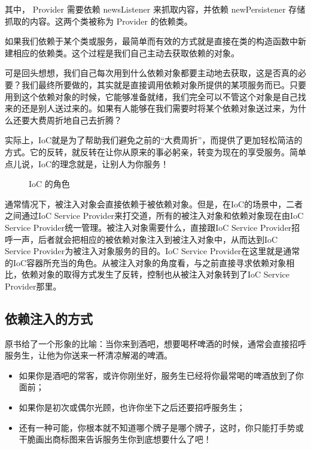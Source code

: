 其中， Provider 需要依赖 newsListener 来抓取内容，并依赖 newPersistener 存储抓取的内容。这两个类被称为 Provider 的依赖类。

如果我们依赖于某个类或服务，最简单而有效的方式就是直接在类的构造函数中新建相应的依赖类。这个过程是我们自己主动去获取依赖的对象。

可是回头想想，我们自己每次用到什么依赖对象都要主动地去获取，这是否真的必要？我们最终所要做的，其实就是直接调用依赖对象所提供的某项服务而已。只要用到这个依赖对象的时候，它能够准备就绪，我们完全可以不管这个对象是自己找来的还是别人送过来的。如果有人能够在我们需要时将某个依赖对象送过来，为什么还要大费周折地自己去折腾？

实际上，IoC就是为了帮助我们避免之前的“大费周折”，而提供了更加轻松简洁的方式。它的反转，就反转在让你从原来的事必躬亲，转变为现在的享受服务。简单点儿说，IoC的理念就是，让别人为你服务！

\begin{figure}[H]
    \small
    \centering
    \caption{IoC 的角色}
    \label{fig:IoC 的角色}
\end{figure}

通常情况下，被注入对象会直接依赖于被依赖对象。但是，在IoC的场景中，二者之间通过IoC Service Provider来打交道，所有的被注入对象和依赖对象现在由IoC Service Provider统一管理。被注入对象需要什么，直接跟IoC Service Provider招呼一声，后者就会把相应的被依赖对象注入到被注入对象中，从而达到IoC Service Provider为被注入对象服务的目的。IoC Service Provider在这里就是通常的IoC容器所充当的角色。从被注入对象的角度看，与之前直接寻求依赖对象相比，依赖对象的取得方式发生了反转，控制也从被注入对象转到了IoC Service Provider那里。

\subsection{依赖注入的方式}

原书给了一个形象的比喻：当你来到酒吧，想要喝杯啤酒的时候，通常会直接招呼服务生，让他为你送来一杯清凉解渴的啤酒。
\begin{itemize}
    \item 如果你是酒吧的常客，或许你刚坐好，服务生已经将你最常喝的啤酒放到了你面前；
    \item 如果你是初次或偶尔光顾，也许你坐下之后还要招呼服务生；
    \item 还有一种可能，你根本就不知道哪个牌子是哪个牌子，这时，你只能打手势或干脆画出商标图来告诉服务生你到底想要什么了吧！
\end{itemize}

